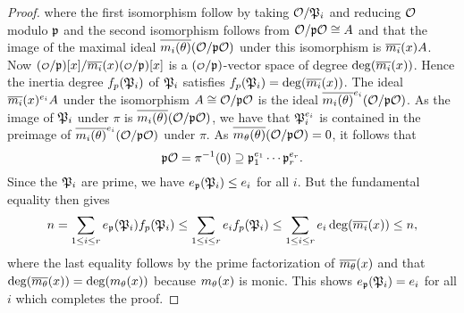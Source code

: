 \begin{proof}
      where the first isomorphism follow by taking $\mathcal{O}/\mathfrak{P}_{i}$ and reducing $\mathcal{O}$ modulo $\mathfrak{p}$ and the second isomorphism follows from $\mathcal{O}/\mathfrak{p}\mathcal{O} \cong A$ and that the image of the maximal ideal $\overline{m_{i}(\theta)}(\mathcal{O}/\mathfrak{p}\mathcal{O})$ under this isomorphism is $\overline{m_{i}}(x)A$. Now $(\smc{O}/\mf{p})[x]/\conj{m_{i}}(x)(\smc{O}/\mf{p})[x]$ is a $(\smc{O}/\mf{p})$-vector space of degree $\deg(\overline{m_{i}}(x))$. Hence the inertia degree $f_{p}(\mathfrak{P}_{i})$ of $\mathfrak{P}_{i}$ satisfies $f_{p}(\mathfrak{P}_{i}) = \deg(\overline{m_{i}}(x))$. The ideal $\overline{m_{i}}(x)^{e_{i}}A$ under the isomorphism $A \cong \mathcal{O}/\mathfrak{p}\mathcal{O}$ is the ideal $\overline{m_{i}(\theta)}^{e_{i}}(\mathcal{O}/\mathfrak{p}\mathcal{O})$. As the image of $\mathfrak{P}_{i}$ under $\pi$ is $\overline{m_{i}(\theta)}(\mathcal{O}/\mathfrak{p}\mathcal{O})$, we have that $\mathfrak{P}_{i}^{e_{i}}$ is contained in the preimage of $\overline{m_{i}(\theta)}^{e_{i}}(\mathcal{O}/\mathfrak{p}\mathcal{O})$ under $\pi$. As $\overline{m_{\theta}(\theta)}(\mathcal{O}/\mathfrak{p}\mathcal{O}) = 0$, it follows that
      \[
        \mathfrak{p}\mathcal{O} = \pi^{-1}(0) \supseteq \mathfrak{p}_{1}^{e_{1}} \cdots \mathfrak{p}_{r}^{e_{r}}.
      \]
      Since the $\mathfrak{P}_{i}$ are prime, we have $e_{\mathfrak{p}}(\mathfrak{P}_{i}) \le e_{i}$ for all $i$. But the fundamental equality then gives
      \[
        n = \sum_{1 \le i \le r}e_{\mathfrak{p}}(\mathfrak{P}_{i})f_{p}(\mathfrak{P}_{i}) \le \sum_{1 \le i \le r}e_{i}f_{p}(\mathfrak{P}_{i}) \le \sum_{1 \le i \le r}e_{i}\deg(\overline{m_{i}}(x)) \le n,
      \]
      where the last equality follows by the prime factorization of $\overline{m_{\theta}}(x)$ and that $\deg(\overline{m_{\theta}}(x)) = \deg(m_{\theta}(x))$ because $m_{\theta}(x)$ is monic. This shows $e_{\mathfrak{p}}(\mathfrak{P}_{i}) = e_{i}$ for all $i$ which completes the proof.
    \end{proof}

